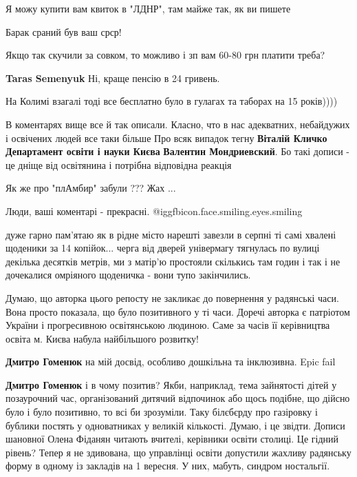 \begin{itemize}
Я можу купити вам квиток в "ЛДНР", там майже так, як ви пишете

Барак сраний був ваш срср!

Якщо так скучили за совком, то можливо і зп вам 60-80 грн платити треба?

\begin{itemize} %
\textbf{Taras Semenyuk}
Ні, краще пенсію в 24 гривень.
\end{itemize} %

На Колимі взагалі тоді все бесплатно було в гулагах та таборах на 15 років))))

В коментарях вище все й так описали.
Класно, что в нас адекватних, небайдужих і освічених людей все таки більше
Про всяк випадок тегну \textbf{Віталій Кличко}
\textbf{Департамент освіти і науки Києва}
\textbf{Валентин Мондриевский}.
Бо такі дописи - це дніще від освітянина і потрібна відповідна реакція

Як же про "плАмбир" забули ??? Жах ...

Люди, ваші коментарі - прекрасні.  @igg{fbicon.face.smiling.eyes.smiling} 


дуже гарно пам'ятаю як в рідне місто нарешті завезли в серпні ті самі хвалені
щоденики за 14 копійок... черга від дверей універмагу тягнулась по вулиці
декілька десятків метрів, ми з матір'ю простояли скількись там годин і так і не
дочекалися омріяного щоденичка - вони тупо закінчились.



Думаю, що авторка цього репосту не закликає до повернення у радянські часи.
Вона просто показала, що було позитивного у ті часи. Доречі авторка є патріотом
України і прогресивною освітянською людиною. Саме за часів її керівництва
освіта м. Києва набула найбільшого розвитку!

\begin{itemize} %
\textbf{Дмитро Гоменюк} на мій досвід, особливо дошкільна та інклюзивна. Epic fail

\textbf{Дмитро Гоменюк} і в чому позитив? Якби, наприклад, тема зайнятості дітей у позаурочний час, організований дитячий відпочинок або щось подібне, що дійсно було і було позитивно, то всі би зрозуміли. Таку білєбєрду про газіровку і бублики постять у одноватниках у великій кількості. Думаю, і це звідти. Дописи шановної Олена Фіданян читають вчителі, керівники освіти столиці. Це гідний рівень? Тепер я не здивована, що управлінці освіти допустили жахливу радянську форму в одному із закладів на 1 вересня. У них, мабуть, синдром ностальгії.


\end{itemize}
\end{itemize}
